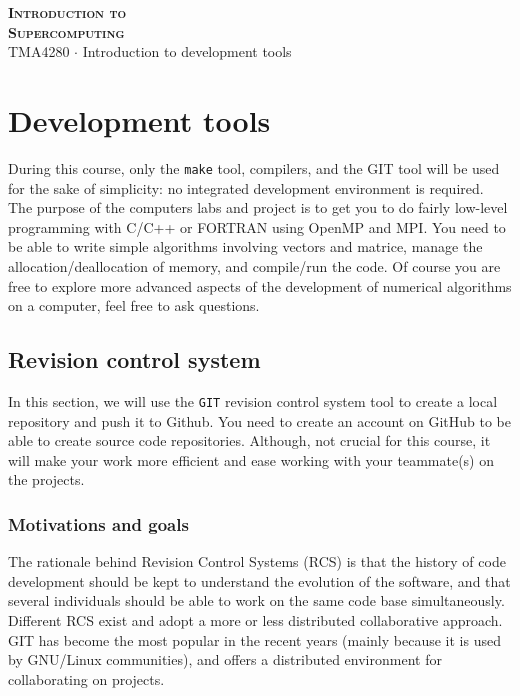 \documentclass[onecolumn, oneside, a4paper, 11pt]{memoir}
\theoremstyle{remark}
\begin{document}
\pagestyle{empty}

\begin{center}
  {\Huge \bfseries \scshape
    Introduction to \\[0.2\baselineskip] Supercomputing} \\[2\baselineskip]
  {\Large TMA4280 $\cdot$ Introduction to development tools} \\[2\baselineskip]
\end{center}

\section{Development tools}

During this course, only the \texttt{make} tool, compilers, and the GIT tool will be used for the sake of simplicity: no integrated development environment is required.
The purpose of the computers labs and project is to get you to do fairly low-level programming with C/C++ or FORTRAN using OpenMP and MPI. You need to be able to write simple algorithms involving vectors and matrice, manage the allocation/deallocation of memory, and compile/run the code.
Of course you are free to explore more advanced aspects of the development of numerical algorithms on a computer, feel free to ask questions.


\subsection{Revision control system}

In this section, we will use the \texttt{GIT} revision control system tool to create a local repository and push it to Github.
You need to create an account on GitHub to be able to create source code repositories.
Although, not crucial for this course, it will make your work more efficient and ease working with your teammate(s) on the projects.

\subsubsection{Motivations and goals}

The rationale behind Revision Control Systems (RCS) is that the history of code development should be kept to understand the evolution of the software, and that several individuals should be able to work on the same code base simultaneously.
Different RCS exist and adopt a more or less distributed collaborative approach.
GIT has become the most popular in the recent years (mainly because it is used by GNU/Linux communities), and offers a distributed environment for collaborating on projects.
\end{document}
